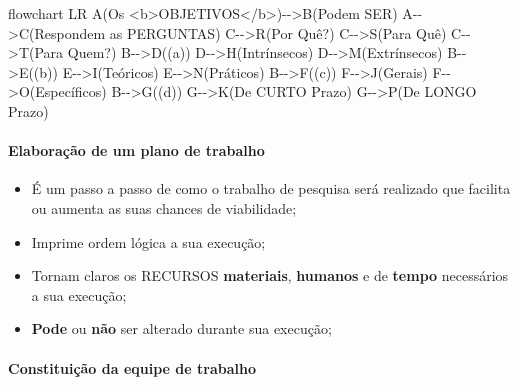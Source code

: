 \documentclass[
]{book}
\newenvironment{Shaded}{\begin{snugshade}}{\end{snugshade}}
\newcommand{\NormalTok}[1]{#1}
\providecommand{\tightlist}{%
  \setlength{\itemsep}{0pt}\setlength{\parskip}{0pt}}
\begin{document}
\begin{Shaded}
\begin{Highlighting}[]
\NormalTok{flowchart LR}
\NormalTok{A(Os \textless{}b\textgreater{}OBJETIVOS\textless{}/b\textgreater{}){-}{-}\textgreater{}B(Podem SER)}
\NormalTok{A{-}{-}\textgreater{}C(Respondem as PERGUNTAS)}
\NormalTok{C{-}{-}\textgreater{}R(Por Quê?)}
\NormalTok{C{-}{-}\textgreater{}S(Para Quê)}
\NormalTok{C{-}{-}\textgreater{}T(Para Quem?)}
\NormalTok{B{-}{-}\textgreater{}D((a))}
\NormalTok{D{-}{-}\textgreater{}H(Intrínsecos)}
\NormalTok{D{-}{-}\textgreater{}M(Extrínsecos)}
\NormalTok{B{-}{-}\textgreater{}E((b))}
\NormalTok{E{-}{-}\textgreater{}I(Teóricos)}
\NormalTok{E{-}{-}\textgreater{}N(Práticos)}
\NormalTok{B{-}{-}\textgreater{}F((c))}
\NormalTok{F{-}{-}\textgreater{}J(Gerais)}
\NormalTok{F{-}{-}\textgreater{}O(Específicos)}
\NormalTok{B{-}{-}\textgreater{}G((d))}
\NormalTok{G{-}{-}\textgreater{}K(De CURTO Prazo)}
\NormalTok{G{-}{-}\textgreater{}P(De LONGO Prazo)}
\end{Highlighting}
\end{Shaded}

\hypertarget{elaborauxe7uxe3o-de-um-plano-de-trabalho}{%
\paragraph{Elaboração de um plano de trabalho}\label{elaborauxe7uxe3o-de-um-plano-de-trabalho}}

\begin{itemize}
\tightlist
\item
  É um passo a passo de como o trabalho de pesquisa será realizado que facilita ou aumenta as suas chances de viabilidade;
\item
  Imprime ordem lógica a sua execução;
\item
  Tornam claros os RECURSOS \textbf{materiais}, \textbf{humanos} e de \textbf{tempo} necessários a sua execução;
\item
  \textbf{Pode} ou \textbf{não} ser alterado durante sua execução;
\end{itemize}

\hypertarget{constituiuxe7uxe3o-da-equipe-de-trabalho}{%
\paragraph{Constituição da equipe de trabalho}\label{constituiuxe7uxe3o-da-equipe-de-trabalho}}
\end{document}
